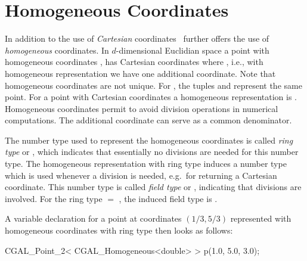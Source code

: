 \section{Homogeneous Coordinates}
In addition to the use of {\em Cartesian} coordinates \cgal\ further offers
the use of {\em homogeneous} coordinates.
In $d$-dimensional Euclidian space a point with homogeneous coordinates
,
has Cartesian coordinates
 where
, i.e., with homogeneous
representation we have one additional coordinate.
Note that homogeneous coordinates are not unique.
For , the tuples
 and
represent the
same point.
For a point with Cartesian coordinates  a
homogeneous representation is .
Homogeneous coordinates permit to avoid division operations in
numerical computations. The additional coordinate can serve as a common
denominator.

The number type used to represent the homogeneous coordinates is called
{\em ring type} or , which indicates that essentially no divisions
are needed for this number type.
The homogeneous representation with ring type  induces a number
type  which is used whenever a division is needed,
e.g.\ for returning a Cartesian coordinate. This number type is called
{\em field type} or , indicating that divisions are involved.
For the ring type 
$=$ , the induced field type is
.

A variable declaration for a point at coordinates $(1/3, 5/3)$
represented with homogeneous coordinates with ring type 
then looks as follows:

\begin{cprog}

  CGAL_Point_2< CGAL_Homogeneous<double> > p(1.0, 5.0, 3.0);

\end{cprog}

